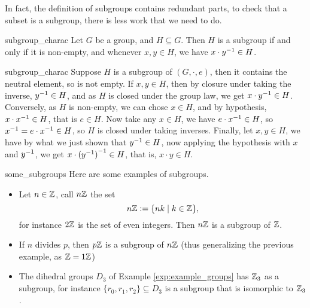 In fact, the definition of subgroups contains redundant parts, to check that a subset is a subgroup, there is less work that we need to do.
\begin{clem}{}{subgroup_charac}
    Let \( G \) be a group, and \( H \subseteq G \). Then \( H \) is a subgroup if and only if it is non-empty, and whenever \( x, y \in H \), we have \( x\cdot{y}^{-1} \in H \). 
\end{clem}
\begin{lemproof}{subgroup_charac}
    Suppose \( H \) is a subgroup of \( (G, \cdot, e) \), then it contains the neutral element, so is not empty. If \( x, y \in H \), then by closure under taking the inverse, \(  {y}^{-1} \in H \), and as \( H \) is closed under the group law, we get \( x \cdot {y}^{-1} \in H \). Conversely, as \( H \) is non-empty, we can chose \( x \in H \), and by hypothesis, \( x \cdot {x}^{-1} \in H \), that is \( e \in H \). Now take any \( x \in H \), we have \( e \cdot {x}^{-1} \in H \), so \( {x}^{-1} = e \cdot {x}^{-1} \in H \), so \( H \) is closed under taking inverses. Finally, let \( x, y \in H \), we have by what we just shown that \( {y}^{-1} \in H \), now applying the hypothesis with \( x \) and \( {y}^{-1} \), we get \( x \cdot {({y}^{-1})}^{-1} \in H \), that is, \( x \cdot y \in H \).
\end{lemproof}

\begin{cexp}{}{some_subgroups}
    Here are some examples of subgroups.
    \begin{itemize}
        \item Let \( n \in \mathbb{Z} \), call \( n\mathbb{Z} \) the set
        \begin{equation*}
            n \mathbb{Z} := \{ nk \mid k \in \mathbb{Z} \},    
        \end{equation*}
        for instance \( 2\mathbb{Z} \) is the set of even integers. Then \( n\mathbb{Z} \) is a subgroup of \( \mathbb{Z} \).
        \item If \( n \) divides \( p \), then \( p\mathbb{Z} \) is a subgroup of \( n\mathbb{Z} \) (thus generalizing the previous example, as \( \mathbb{Z} = 1\mathbb{Z} \))
        \item The dihedral groups \( D_3 \) of Example \ref{exp:example_groups} has \( \mathbb{Z}_3 \) as a subgroup, for instance \( \{ r_0, r_1, r_2 \} \subseteq D_3 \) is a subgroup that is isomorphic to \( \mathbb{Z}_3 \).
    \end{itemize}

\end{cexp}

